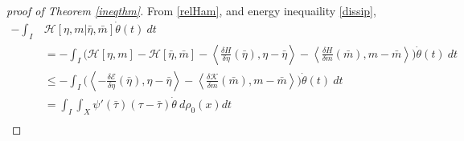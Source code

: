 \documentclass[10pt, letterpaper]{article}
\def\E{{\mathcal{E}}}
\def\H{{\mathcal{H}}}
\def\K{{\mathcal{K}}}
\def\dr{{d\rho_0(x)}}
\theoremstyle{definition}
\theoremstyle{remark}
\newtheorem{remark}[subsubsection]{Remark}
\begin{document}
% 
\begin{proof}[proof of Theorem \ref{ineqthm}]
From \eqref{relHam}, and energy inequaility \eqref{dissip},
\begin{equation} \label{firsteqn}
 \begin{aligned}
        -\int_I &\H[\eta, {m} | \bar{\eta}, {\bar{m}}] \dot\theta(t)\:dt \\
        &= -\int_I \bigg(\H[\eta, {m}] - \H[\bar{\eta}, {\bar{m}}]-  \left\langle \frac{\delta H}{\delta \eta}(\bar{\eta}), \eta - \bar\eta\right\rangle - \left\langle \frac{\delta H}{\delta {m}}(\bar{m}),{m} - \bar{m}\right\rangle \bigg)\dot\theta(t) \: dt\\
        &\le -\int_I \bigg(\left\langle -\frac{\delta\E}{\delta \eta}(\bar{\eta}), \eta - \bar\eta\right\rangle - \left\langle \frac{\delta \K}{\delta {m}}(\bar{m}),{m} - \bar{m}\right\rangle \bigg)\dot\theta(t) \: dt\\
        & =\int_I\int_X \psi'(\bar\tau)(\tau - \bar\tau)\dot\theta \: \dr dt \\

\end{aligned}
\end{equation}
\end{proof}
\end{document}
